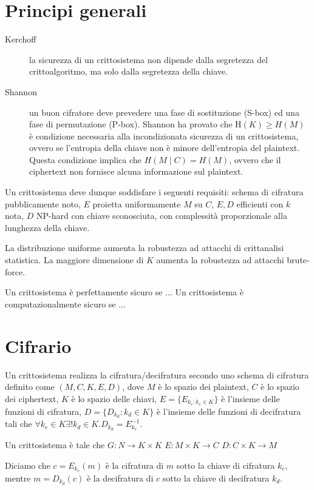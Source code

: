 \section{Principi generali}
\begin{description}
  \item[Kerchoff] la sicurezza di un crittosistema non dipende dalla segretezza del crittoalgoritmo, ma solo dalla segretezza della chiave.
  \item[Shannon] un buon cifratore deve prevedere una fase di sostituzione (S-box) ed una fase di permutazione (P-box). Shannon ha provato che H$(K)\geq H(M)$ è condizione necessaria alla incondizionata sicurezza di un crittosistema, ovvero se l'entropia della chiave non è minore dell'entropia del plaintext. Questa condizione implica che $H(M\mid C)=H(M)$, ovvero che il ciphertext non fornisce alcuna informazione sul plaintext.
\end{description}

Un crittosistema deve dunque soddisfare i seguenti requisiti: schema di cifratura pubblicamente noto, $E$ proietta uniformamente $M$ su $C$, $E,D$ efficienti con $k$ nota, $D$ NP-hard con chiave sconosciuta, con complessità proporzionale alla lunghezza della chiave.

La distribuzione uniforme aumenta la robustezza ad attacchi di crittanalisi statistica. La maggiore dimensione di $K$ aumenta la robustezza ad attacchi brute-force.

Un crittosistema è perfettamente sicuro se ...
Un crittosistema è computazionalmente sicuro se ...

\section{Cifrario}
Un crittosistema realizza la cifratura/decifratura secondo uno schema di cifratura definito come $(M,C,K,E,D)$, dove
$M$ è lo spazio dei plaintext,
$C$ è lo spazio dei ciphertext,
$K$ è lo spazio delle chiavi,
$E=\{E_{k_{e}:k_{e}\in K}\}$ è l'insieme delle funzioni di cifratura,
$D=\{D_{k_d}:k_{d}\in K\}$ è l'insieme delle funzioni di decifratura
tali che $\forall k_{e}\in K \exists! k_{d}\in K . D_{k_{d}}=E_{k_{e}}^{-1}$.

Un crittosistema è tale che
$G:N\rightarrow K \times K$
$E: M \times K \rightarrow C$
$D: C \times K \rightarrow M$

Diciamo che $c=E_{k_{e}}(m)$ è la cifratura di $m$ sotto la chiave di cifratura $k_{e}$, mentre $m=D_{k_{d}}(c)$ è la decifratura di $c$ sotto la chiave di decifratura $k_{d}$.

